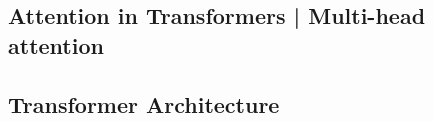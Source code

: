 \documentclass[11pt]{article}
\begin{document}
\begin{figure}[H]
{    }
\end{figure}

\subsection{Attention in Transformers | Multi-head attention}

\begin{figure}[H]
    \centering
\end{figure}

\begin{figure}[H]
    \centering
\end{figure}

\begin{figure}[H]
    \centering
\end{figure}

\subsection{Transformer Architecture}
\end{document}
